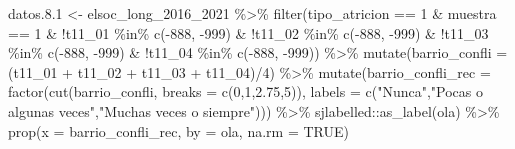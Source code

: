 \documentclass[
  12pt,
]{book}
\newenvironment{Shaded}{\begin{snugshade}}{\end{snugshade}}
\newcommand{\AttributeTok}[1]{\textcolor[rgb]{0.77,0.63,0.00}{#1}}
\newcommand{\ConstantTok}[1]{\textcolor[rgb]{0.00,0.00,0.00}{#1}}
\newcommand{\DecValTok}[1]{\textcolor[rgb]{0.00,0.00,0.81}{#1}}
\newcommand{\FloatTok}[1]{\textcolor[rgb]{0.00,0.00,0.81}{#1}}
\newcommand{\FunctionTok}[1]{\textcolor[rgb]{0.00,0.00,0.00}{#1}}
\newcommand{\NormalTok}[1]{#1}
\newcommand{\OtherTok}[1]{\textcolor[rgb]{0.56,0.35,0.01}{#1}}
\newcommand{\SpecialCharTok}[1]{\textcolor[rgb]{0.00,0.00,0.00}{#1}}
\newcommand{\StringTok}[1]{\textcolor[rgb]{0.31,0.60,0.02}{#1}}
\begin{document}
\begin{Shaded}
\begin{Highlighting}[]
\NormalTok{datos.}\FloatTok{8.1} \OtherTok{\textless{}{-}}\NormalTok{ elsoc\_long\_2016\_2021 }\SpecialCharTok{\%\textgreater{}\%} 
  \FunctionTok{filter}\NormalTok{(tipo\_atricion }\SpecialCharTok{==} \DecValTok{1} \SpecialCharTok{\&}\NormalTok{ muestra }\SpecialCharTok{==} \DecValTok{1} \SpecialCharTok{\&} \SpecialCharTok{!}\NormalTok{t11\_01 }\SpecialCharTok{\%in\%} \FunctionTok{c}\NormalTok{(}\SpecialCharTok{{-}}\DecValTok{888}\NormalTok{, }\SpecialCharTok{{-}}\DecValTok{999}\NormalTok{) }\SpecialCharTok{\&}
           \SpecialCharTok{!}\NormalTok{t11\_02 }\SpecialCharTok{\%in\%} \FunctionTok{c}\NormalTok{(}\SpecialCharTok{{-}}\DecValTok{888}\NormalTok{, }\SpecialCharTok{{-}}\DecValTok{999}\NormalTok{) }\SpecialCharTok{\&} \SpecialCharTok{!}\NormalTok{t11\_03 }\SpecialCharTok{\%in\%} \FunctionTok{c}\NormalTok{(}\SpecialCharTok{{-}}\DecValTok{888}\NormalTok{, }\SpecialCharTok{{-}}\DecValTok{999}\NormalTok{) }\SpecialCharTok{\&} \SpecialCharTok{!}\NormalTok{t11\_04 }\SpecialCharTok{\%in\%} \FunctionTok{c}\NormalTok{(}\SpecialCharTok{{-}}\DecValTok{888}\NormalTok{, }\SpecialCharTok{{-}}\DecValTok{999}\NormalTok{)) }\SpecialCharTok{\%\textgreater{}\%} 
  \FunctionTok{mutate}\NormalTok{(}\AttributeTok{barrio\_confli =}\NormalTok{ (t11\_01 }\SpecialCharTok{+}\NormalTok{ t11\_02 }\SpecialCharTok{+}\NormalTok{ t11\_03 }\SpecialCharTok{+}\NormalTok{ t11\_04)}\SpecialCharTok{/}\DecValTok{4}\NormalTok{) }\SpecialCharTok{\%\textgreater{}\%}
  \FunctionTok{mutate}\NormalTok{(}\AttributeTok{barrio\_confli\_rec =} \FunctionTok{factor}\NormalTok{(}\FunctionTok{cut}\NormalTok{(barrio\_confli, }\AttributeTok{breaks =} \FunctionTok{c}\NormalTok{(}\DecValTok{0}\NormalTok{,}\DecValTok{1}\NormalTok{,}\FloatTok{2.75}\NormalTok{,}\DecValTok{5}\NormalTok{)),}
         \AttributeTok{labels =} \FunctionTok{c}\NormalTok{(}\StringTok{"Nunca"}\NormalTok{,}\StringTok{"Pocas o algunas veces"}\NormalTok{,}\StringTok{"Muchas veces o siempre"}\NormalTok{))) }\SpecialCharTok{\%\textgreater{}\%}
\NormalTok{  sjlabelled}\SpecialCharTok{::}\FunctionTok{as\_label}\NormalTok{(ola) }\SpecialCharTok{\%\textgreater{}\%} 
  \FunctionTok{prop}\NormalTok{(}\AttributeTok{x =}\NormalTok{ barrio\_confli\_rec, }\AttributeTok{by =}\NormalTok{ ola, }\AttributeTok{na.rm =} \ConstantTok{TRUE}\NormalTok{)}


\end{Highlighting}
\end{Shaded}
\end{document}
